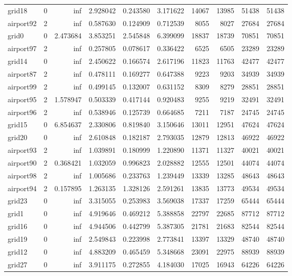 \begin{longtable}{|l|r|r|r|r|r|r|r|r|r|}
grid18 & 0 & inf & 2.928042 & 0.243580 & 3.171622 & 14067 & 13985 & 51438 & 51438 \\
airport92 & 2 & inf & 0.587630 & 0.124909 & 0.712539 & 8055 & 8027 & 27684 & 27684 \\
grid0 & 0 & 2.473684 & 3.853251 & 2.545848 & 6.399099 & 18837 & 18739 & 70851 & 70851 \\
airport97 & 2 & inf & 0.257805 & 0.078617 & 0.336422 & 6525 & 6505 & 23289 & 23289 \\
grid14 & 0 & inf & 2.450622 & 0.166574 & 2.617196 & 11823 & 11763 & 42477 & 42477 \\
airport87 & 2 & inf & 0.478111 & 0.169277 & 0.647388 & 9223 & 9203 & 34939 & 34939 \\
airport99 & 2 & inf & 0.499145 & 0.132007 & 0.631152 & 8309 & 8279 & 28851 & 28851 \\
airport95 & 2 & 1.578947 & 0.503339 & 0.417144 & 0.920483 & 9255 & 9219 & 32491 & 32491 \\
airport96 & 2 & inf & 0.538946 & 0.125739 & 0.664685 & 7211 & 7187 & 24745 & 24745 \\
grid15 & 0 & 6.854637 & 2.330806 & 0.819840 & 3.150646 & 13011 & 12951 & 47624 & 47624 \\
grid20 & 0 & inf & 2.610848 & 0.182187 & 2.793035 & 12879 & 12813 & 46922 & 46922 \\
airport93 & 2 & inf & 1.039891 & 0.180999 & 1.220890 & 11371 & 11327 & 40021 & 40021 \\
airport90 & 2 & 0.368421 & 1.032059 & 0.996823 & 2.028882 & 12555 & 12501 & 44074 & 44074 \\
airport98 & 2 & inf & 1.005686 & 0.233763 & 1.239449 & 13339 & 13285 & 48643 & 48643 \\
airport94 & 2 & 0.157895 & 1.263135 & 1.328126 & 2.591261 & 13835 & 13773 & 49534 & 49534 \\
grid23 & 0 & inf & 3.315055 & 0.253983 & 3.569038 & 17337 & 17259 & 65444 & 65444 \\
grid1 & 0 & inf & 4.919646 & 0.469212 & 5.388858 & 22797 & 22685 & 87712 & 87712 \\
grid16 & 0 & inf & 4.944506 & 0.442799 & 5.387305 & 21781 & 21683 & 82544 & 82544 \\
grid19 & 0 & inf & 2.549843 & 0.223998 & 2.773841 & 13397 & 13329 & 48740 & 48740 \\
grid12 & 0 & inf & 4.883209 & 0.465459 & 5.348668 & 23091 & 22975 & 88939 & 88939 \\
grid27 & 0 & inf & 3.911175 & 0.272855 & 4.184030 & 17025 & 16943 & 64226 & 64226 \\

\end{longtable}
